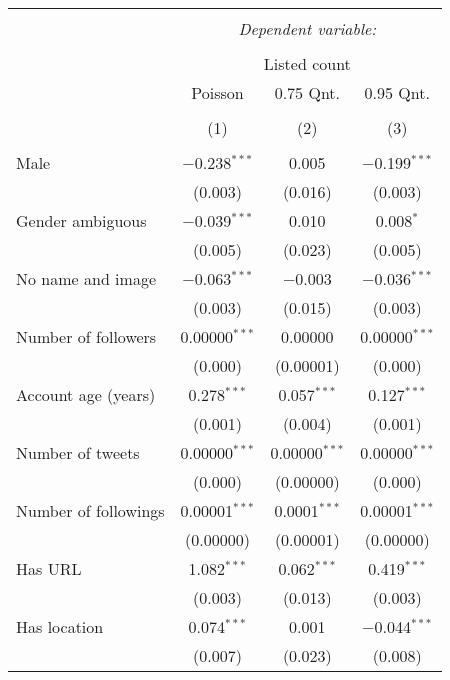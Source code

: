 
\begin{table}[!htbp] \centering 
  \caption{} 
  \label{} 
\begin{tabular}{@{\extracolsep{5pt}}lccc} 
\\[-1.8ex]\hline 
\hline \\[-1.8ex] 
 & \multicolumn{3}{c}{\textit{Dependent variable:}} \\ 
\cline{2-4} 
\\[-1.8ex] & \multicolumn{3}{c}{Listed count} \\ 
 & Poisson & 0.75 Qnt. & 0.95 Qnt. \\ 
\\[-1.8ex] & (1) & (2) & (3)\\ 
\hline \\[-1.8ex] 
 Male & $-$0.238$^{***}$ & 0.005 & $-$0.199$^{***}$ \\ 
  & (0.003) & (0.016) & (0.003) \\ 
  Gender ambiguous & $-$0.039$^{***}$ & 0.010 & 0.008$^{*}$ \\ 
  & (0.005) & (0.023) & (0.005) \\ 
  No name and image & $-$0.063$^{***}$ & $-$0.003 & $-$0.036$^{***}$ \\ 
  & (0.003) & (0.015) & (0.003) \\ 
  Number of followers & 0.00000$^{***}$ & 0.00000 & 0.00000$^{***}$ \\ 
  & (0.000) & (0.00001) & (0.000) \\ 
  Account age (years) & 0.278$^{***}$ & 0.057$^{***}$ & 0.127$^{***}$ \\ 
  & (0.001) & (0.004) & (0.001) \\ 
  Number of tweets & 0.00000$^{***}$ & 0.00000$^{***}$ & 0.00000$^{***}$ \\ 
  & (0.000) & (0.00000) & (0.000) \\ 
  Number of followings & 0.00001$^{***}$ & 0.0001$^{***}$ & 0.00001$^{***}$ \\ 
  & (0.00000) & (0.00001) & (0.00000) \\ 
  Has URL & 1.082$^{***}$ & 0.062$^{***}$ & 0.419$^{***}$ \\ 
  & (0.003) & (0.013) & (0.003) \\ 
  Has location & 0.074$^{***}$ & 0.001 & $-$0.044$^{***}$ \\ 
  & (0.007) & (0.023) & (0.008) \\ 

\end{tabular}
\end{table}
